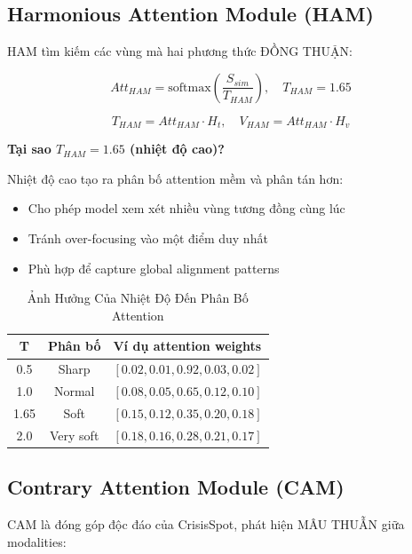 \documentclass[12pt,a4paper]{article}
\begin{document}
\subsection{Harmonious Attention Module (HAM)}

HAM tìm kiếm các vùng mà hai phương thức ĐỒNG THUẬN:

\begin{equation}
Att_{HAM} = \text{softmax}\left(\frac{S_{sim}}{T_{HAM}}\right), \quad T_{HAM} = 1.65
\label{eq:ham}
\end{equation}

\begin{equation}
T_{HAM} = Att_{HAM} \cdot H_t, \quad V_{HAM} = Att_{HAM} \cdot H_v
\end{equation}

\textbf{Tại sao $T_{HAM} = 1.65$ (nhiệt độ cao)?}

Nhiệt độ cao tạo ra phân bố attention mềm và phân tán hơn:
\begin{itemize}
    \item Cho phép model xem xét nhiều vùng tương đồng cùng lúc
    \item Tránh over-focusing vào một điểm duy nhất
    \item Phù hợp để capture global alignment patterns
\end{itemize}

\begin{table}[H]
\centering
\caption{Ảnh Hưởng Của Nhiệt Độ Đến Phân Bố Attention}
\label{tab:temperature}
\begin{tabular}{c|c|l}
\toprule
\textbf{T} & \textbf{Phân bố} & \textbf{Ví dụ attention weights} \\
\midrule
0.5 & Sharp & $[0.02, 0.01, \mathbf{0.92}, 0.03, 0.02]$ \\
1.0 & Normal & $[0.08, 0.05, \mathbf{0.65}, 0.12, 0.10]$ \\
1.65 & Soft & $[0.15, 0.12, \mathbf{0.35}, 0.20, 0.18]$ \\
2.0 & Very soft & $[0.18, 0.16, \mathbf{0.28}, 0.21, 0.17]$ \\
\bottomrule
\end{tabular}
\end{table}

\subsection{Contrary Attention Module (CAM)}

CAM là đóng góp độc đáo của CrisisSpot, phát hiện MÂU THUẪN giữa modalities:
\end{document}
